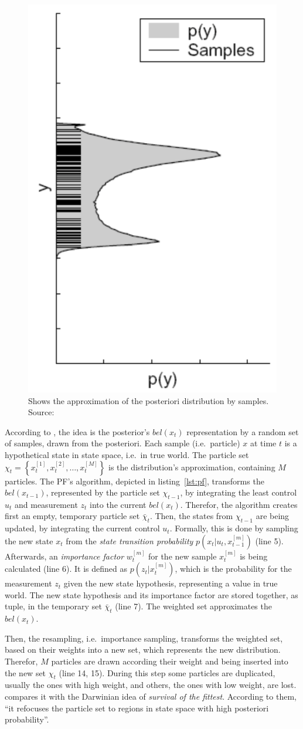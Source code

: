 \begin{figure}
	\includegraphics[height=0.45\textwidth]{figures/pf_approx}
	\caption{Shows the approximation of the posteriori distribution by samples. Source: \citep{thrun:prob_robo}}
	\label{fig:pf_approx}
\end{figure} 

According to \citet{thrun:prob_robo}, the idea is the posterior's $bel(x_t)$ representation by a random set of samples, drawn from the posteriori. Each sample (i.e.\ particle) $x$ at time $t$ is a hypothetical state in state space, i.e.\ in true world. The particle set $\chi_t = \left\{ x^{[1]}_t, x^{[2]}_t, \ldots, x^{[M]}_t \right\}$ is the distribution's approximation, containing $M$ particles. The \acs{PF}'s algorithm, depicted in listing~\ref{lst:pf}, transforms the $bel(x_{t-1})$, represented by the particle set $\chi_{t-1}$, by integrating the least control $u_t$ and measurement $z_t$ into the current $bel(x_t)$. Therefor, the algorithm creates first an empty, temporary particle set $\bar{\chi}_t$. Then, the states from $\chi_{t-1}$ are being updated, by integrating the current control $u_t$. Formally, this is done by sampling the new state $x_t$ from the \emph{state transition probability} $p(x_t|u_t, x^{[m]}_{t-1})$ (line 5). Afterwards, an \emph{importance factor} $w^{[m]}_t$ for the new sample $x^{[m]}_t$ is being calculated (line 6). It is defined as $p(z_t|x^{[m]}_t)$, which is the probability for the measurement $z_t$ given the new state hypothesis, representing a value in true world. The new state hypothesis and its importance factor are stored together, as tuple, in the temporary set $\bar{\chi}_t$ (line 7). The weighted set approximates the $bel(x_t)$.

Then, the resampling, i.e.\ importance sampling, transforms the weighted set, based on their weights into a new set, which represents the new distribution. Therefor, $M$ particles are drawn according their weight and being inserted into the new set $\chi_t$ (line 14, 15). During this step some particles are duplicated, usually the ones with high weight, and others, the ones with low weight, are lost. \citet{thrun:prob_robo} compares it with the Darwinian idea of \emph{survival of the fittest}. According to them, ``it refocuses the particle set to regions in state space with high posteriori probability''.
 
